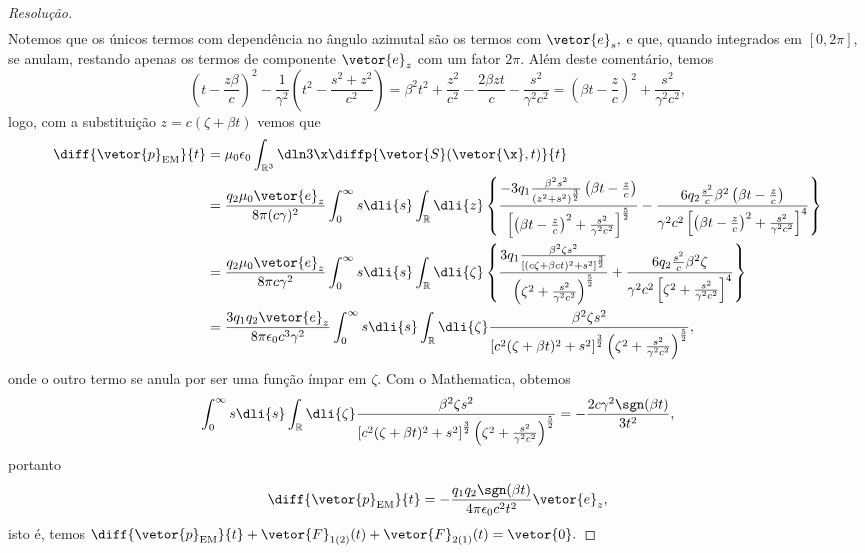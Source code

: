 \begin{proof}[Resolução]
\begin{align*}
   \end{align*}
   Notemos que os únicos termos com dependência no ângulo azimutal são os termos com \(\vetor{e}_s,\) e que, quando integrados em \([0,2\pi]\), se anulam, restando apenas os termos de componente \(\vetor{e}_z\) com um fator \(2\pi\). Além deste comentário, temos
   \begin{equation*}
      \left(t - \frac{z \beta}{c}\right)^2 - \frac{1}{\gamma^2} \left(t^2 - \frac{s^2 + z^2}{c^2}\right) = \beta^2 t^2 + \frac{z^2}{c^2} - \frac{2 \beta z t}{c} - \frac{s^2}{\gamma^2 c^2} = \left(\beta t - \frac{z}{c}\right)^2 + \frac{s^2}{\gamma^2 c^2},
   \end{equation*}
   logo, com a substituição \(z = c( \zeta + \beta t)\) vemos que
   \begin{align*}
      \diff{\vetor{p}_\mathrm{EM}}{t} 
      &= \mu_0 \epsilon_0 \int_{\mathbb{R}^3} \dln3\x \diffp{\vetor{S}(\vetor{\x}, t)}{t}\\
      &= \frac{q_2 \mu_0 \vetor{e}_z}{8\pi (c \gamma)^2} \int_{0}^{\infty} s \dli{s} \int_{\mathbb{R}} \dli{z} \left\{
      \frac{-3q_1 \frac{\beta^2 s^2}{(z^2 + s^2)^{\frac32}} \left(\beta t - \frac{z}{c}\right)}{\left[\left(\beta t - \frac{z}{c}\right)^2+ \frac{s^2}{\gamma^2c^2}\right]^{\frac52}}
         -\frac{6q_2 \frac{s^2}{c} \beta^2\left(\beta t - \frac{z}{c}\right)}{\gamma^2 c^2\left[\left(\beta t - \frac{z}{c}\right)^2+ \frac{s^2}{\gamma^2c^2}\right]^{4}} \right\}\\
      &= \frac{q_2 \mu_0 \vetor{e}_z}{8\pi c\gamma^2} \int_{0}^{\infty} s \dli{s} \int_{\mathbb{R}} \dli{\zeta} \left\{
      \frac{3q_1 \frac{\beta^2 \zeta s^2}{[(c\zeta + \beta c t)^2 + s^2]^{\frac32}}}{\left(\zeta^2+ \frac{s^2}{\gamma^2c^2}\right)^{\frac52}}
         +\frac{6q_2 \frac{s^2}{c} \beta^2 \zeta }{\gamma^2 c^2\left[\zeta^2+ \frac{s^2}{\gamma^2c^2}\right]^{4}} \right\}\\
      &= \frac{3 q_1 q_2 \vetor{e}_z}{8\pi \epsilon_0 c^3\gamma^2} \int_{0}^{\infty} s \dli{s} \int_{\mathbb{R}} \dli{\zeta} \frac{\beta^2 \zeta s^2}{\left[c^2(\zeta + \beta t)^2 + s^2\right]^{\frac32} \left(\zeta^2 + \frac{s^2}{\gamma^2 c^2}\right)^{\frac52}},
   \end{align*}
   onde o outro termo se anula por ser uma função ímpar em \(\zeta.\) Com o Mathematica, obtemos
   \begin{equation*}
      \int_{0}^{\infty} s \dli{s} \int_{\mathbb{R}} \dli{\zeta} \frac{\beta^2 \zeta s^2}{\left[c^2(\zeta + \beta t)^2 + s^2\right]^{\frac32} \left(\zeta^2 + \frac{s^2}{\gamma^2 c^2}\right)^{\frac52}} = -\frac{2 c \gamma^2 \sgn(\beta t)}{3 t^2},
   \end{equation*}
   portanto
   \begin{equation*}
      \diff{\vetor{p}_\mathrm{EM}}{t} = -\frac{q_1 q_2 \sgn(\beta t)}{4\pi \epsilon_0 c^2 t^2} \vetor{e}_z,
   \end{equation*}
   isto é, temos \(\diff{\vetor{p}_\mathrm{EM}}{t} + \vetor{F}_{1(2)}(t) + \vetor{F}_{2(1)}(t) = \vetor{0}.\)
\end{proof}
